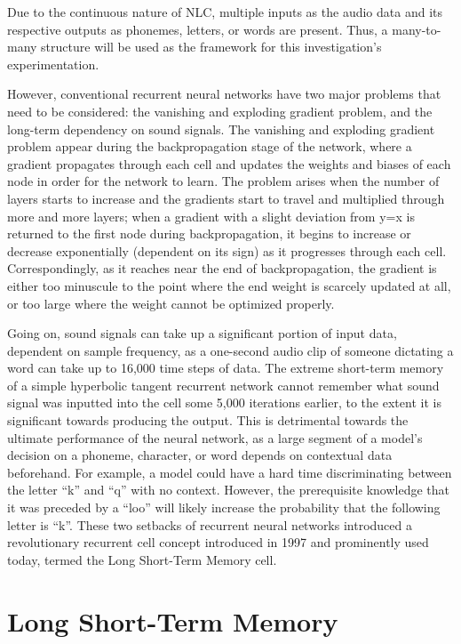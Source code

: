 \par
Due to the continuous nature of NLC, multiple inputs as the audio data and its respective outputs as phonemes, letters, or words are present. Thus, a many-to-many structure will be used as the framework for this investigation’s experimentation.
\par
However, conventional recurrent neural networks have two major problems that need to be considered: the vanishing and exploding gradient problem, and the long-term dependency on sound signals. The vanishing and exploding gradient problem appear during the backpropagation stage of the network, where a gradient propagates through each cell and updates the weights and biases of each node in order for the network to learn. The problem arises when the number of layers starts to increase and the gradients start to travel and multiplied through more and more layers; when a gradient with a slight deviation from y=x is returned to the first node during backpropagation, it begins to increase or decrease exponentially (dependent on its sign) as it progresses through each cell. Correspondingly, as it reaches near the end of backpropagation, the gradient is either too minuscule to the point where the end weight is scarcely updated at all, or too large where the weight cannot be optimized properly.
\par
Going on, sound signals can take up a significant portion of input data, dependent on sample frequency, as a one-second audio clip of someone dictating a word can take up to 16,000 time steps of data. The extreme short-term memory of a simple hyperbolic tangent recurrent network cannot remember what sound signal was inputted into the cell some 5,000 iterations earlier, to the extent it is significant towards producing the output. This is detrimental towards the ultimate performance of the neural network, as a large segment of a model’s decision on a phoneme, character, or word depends on contextual data beforehand. For example, a model could have a hard time discriminating between the letter “k” and “q” with no context. However, the prerequisite knowledge that it was preceded by a “loo” will likely increase the probability that the following letter is “k”. These two setbacks of recurrent neural networks introduced a revolutionary recurrent cell concept introduced in 1997 and prominently used today, termed the Long Short-Term Memory cell.

\section{Long Short-Term Memory}

